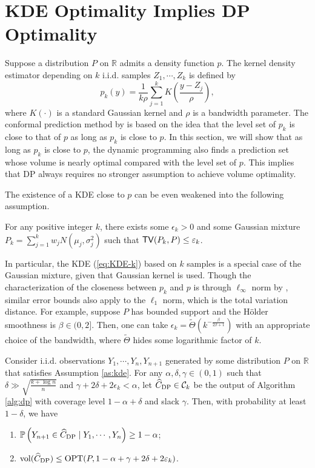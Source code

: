 \section{KDE Optimality Implies DP Optimality}\label{sec:DPvsKDE}

Suppose a distribution $P$ on $\mathbb{R}$ admits a density function $p$. The kernel density estimator depending on $k$ i.i.d. samples $Z_1,\cdots,Z_k$ is defined by
\begin{equation}
p_k(y)=\frac{1}{k\rho}\sum_{j=1}^kK\left(\frac{y-Z_j}{\rho}\right),\label{eq:KDE-k}
\end{equation}
where $K(\cdot)$ is a standard Gaussian kernel and $\rho$ is a bandwidth parameter. The conformal prediction method by \cite{Lei2013DistributionFreePS} is based on the idea that the level set of $p_k$ is close to that of $p$ as long as $p_k$ is close to $p$. In this section, we will show that as long as $p_k$ is close to $p$, the dynamic programming also finds a prediction set whose volume is nearly optimal compared with the level set of $p$. This implies that DP always requires no stronger assumption to achieve volume optimality.

The existence of a KDE close to $p$ can be even weakened into the following assumption.
\begin{assumption}\label{as:kde}
For any positive integer $k$, there exists some $\epsilon_k>0$ and some Gaussian mixture $P_k=\sum_{j=1}^k w_jN(\mu_j,\sigma_j^2)$ such that ${\sf TV}(P_k,P)\leq\varepsilon_k$.
\end{assumption}
In particular, the KDE (\ref{eq:KDE-k}) based on $k$ samples is a special case of the Gaussian mixture, given that Gaussian kernel is used. Though the characterization of the closeness between $p_k$ and $p$ is through $\ell_{\infty}$ norm by \cite{Lei2013DistributionFreePS}, similar error bounds also apply to the $\ell_1$ norm, which is the total variation distance. For example, suppose $P$ has bounded support and the Hölder smoothness is $\beta\in (0,2]$. Then, one can take $\epsilon_k=\widetilde{\Theta}\left(k^{-\frac{\beta}{2\beta+1}}\right)$ with an appropriate choice of the bandwidth, where $\widetilde{\Theta}$ hides some logarithmic factor of $k$.

\begin{theorem}\label{thm:DPvsKDE}
Consider i.i.d. observations $Y_1,\cdots,Y_n,Y_{n+1}$ generated by some distribution $P$ on $\mathbb{R}$ that satisfies Assumption \ref{as:kde}. For any $\alpha,\delta,\gamma\in(0,1)$ such that $\delta\gg\sqrt{\frac{k+\log n}{n}}$ and $\gamma+2\delta+2\epsilon_k<\alpha$, let $\widehat{C}_{\rm DP}\in\mathcal{C}_k$ be the output of Algorithm \ref{alg:dp} with coverage level $1-\alpha+\delta$ and slack $\gamma$. Then, with probability at least $1-\delta$, we have
\begin{enumerate}
\item $\mathbb{P}\left(Y_{n+1}\in \widehat{C}_{\rm DP}\mid Y_1,\cdots,Y_n\right)\geq 1-\alpha$;
\item $\mathrm{vol}(\widehat{C}_{\rm DP})\leq \operatorname{OPT}(P,1-\alpha+\gamma+2\delta+2\varepsilon_k)$.
\end{enumerate}
\end{theorem}

